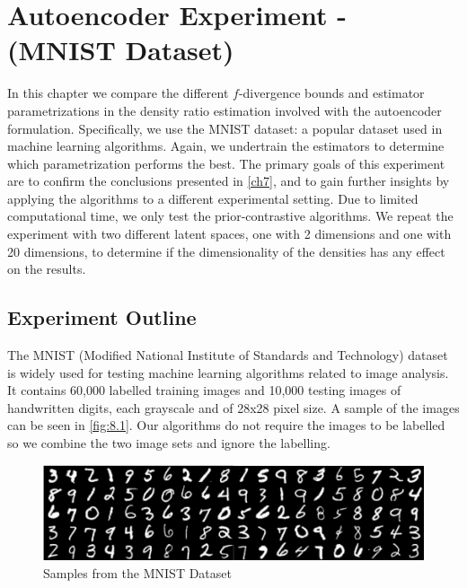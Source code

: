 \documentclass[honours,12pt, twoside]{unswthesis}
\numberwithin{equation}{section}
\theoremstyle{definition}
\begin{document}
\chapter{Autoencoder Experiment - (MNIST Dataset)}\label{ch8}
In this chapter we compare the different $f$-divergence bounds and estimator parametrizations in the density ratio estimation involved with the autoencoder formulation. Specifically, we use the MNIST dataset: a popular dataset used in machine learning algorithms. Again, we undertrain the estimators to determine which parametrization performs the best. The primary goals of this experiment are to confirm the conclusions presented in \autoref{ch7}, and to gain further insights by applying the algorithms to a different experimental setting. Due to limited computational time, we only test the prior-contrastive algorithms. We repeat the experiment with two different latent spaces, one with 2 dimensions and one with 20 dimensions, to determine if the dimensionality of the densities has any effect on the results.
\section{Experiment Outline}
The MNIST (Modified National Institute of Standards and Technology) dataset is widely used for testing machine learning algorithms related to image analysis. It contains 60,000 labelled training images and 10,000 testing images of handwritten digits, each grayscale and of 28x28 pixel size. A sample of the images can be seen in \autoref{fig:8.1}. Our algorithms do not require the images to be labelled so we combine the two image sets and ignore the labelling.
\begin{figure}[b]
\includegraphics[width=\linewidth]{mnist-digits-small.png}
\caption{Samples from the MNIST Dataset}
\label{fig:8.1}
\end{figure}
\end{document}
